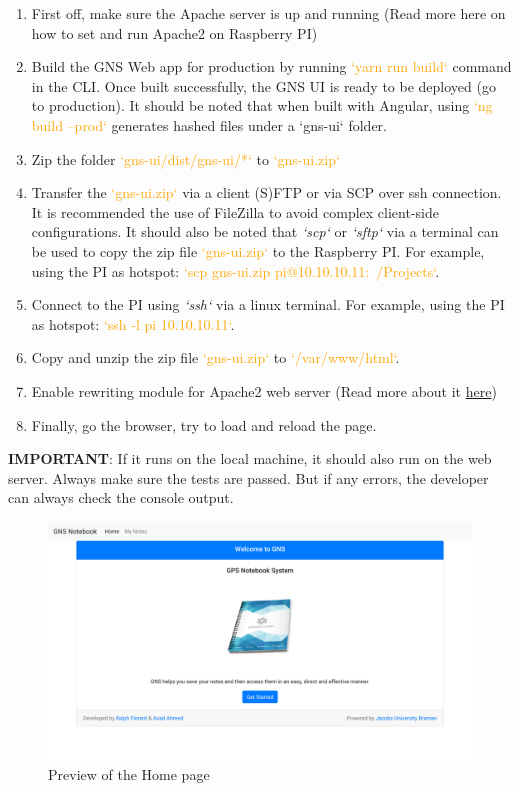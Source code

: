 \begin{enumerate}
    \item First off, make sure the Apache server is up and running (Read more here on how to set and run Apache2 on Raspberry PI)
    \item Build the GNS Web app for production by running \textcolor{orange}{`yarn run build`} command in the CLI. Once built successfully, the GNS UI is ready to be deployed (go to production). It should be noted that when built with Angular, using \textcolor{orange}{`ng build --prod`} generates hashed files under a `gns-ui` folder.
    \item Zip the folder \textcolor{orange}{`gns-ui/dist/gns-ui/*`} to \textcolor{orange}{`gns-ui.zip`}
    \item Transfer the \textcolor{orange}{`gns-ui.zip`} via a client (S)FTP or via SCP over ssh connection. It is recommended the use of FileZilla to avoid complex client-side configurations. It should also be noted that \textit{`scp`} or \textit{`sftp`} via a terminal can be used to copy the zip file \textcolor{orange}{`gns-ui.zip`} to the Raspberry PI. For example, using the PI as hotspot: \textcolor{orange}{`scp gns-ui.zip pi@10.10.10.11:~/Projects`}.
    \item Connect to the PI using \textit{`ssh`} via a linux terminal. For example, using the PI as hotspot: \textcolor{orange}{`ssh -l pi 10.10.10.11`}.
    \item Copy and unzip the zip file \textcolor{orange}{`gns-ui.zip`} to \textcolor{orange}{`/var/www/html`}.
    \item Enable rewriting module for Apache2 web server (Read more about it \href{https://www.digitalocean.com/community/tutorials/how-to-rewrite-urls-with-mod_rewrite-for-apache-on-ubuntu-16-04}{here})
    \item Finally, go the browser, try to load and reload the page.
\end{enumerate}

\noindent
\textbf{IMPORTANT}: If it runs on the local machine, it should also run on the web server. Always make sure the tests are passed. But if any errors, the developer can always check the console output.\\

\begin{figure}
    \centering
        \includegraphics[width=1\textwidth]{images/screenshots/gns-ui-screenshot_home.png}
        \caption{Preview of the Home page}
        \label{fig:gns-ui-home}
\end{figure}

